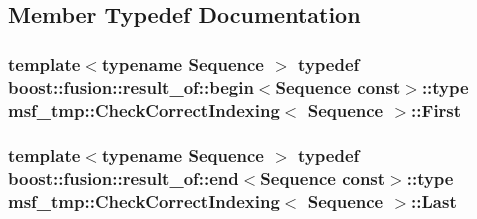 \subsection{Member Typedef Documentation}
\hypertarget{structmsf__tmp_1_1CheckCorrectIndexing_ac3c063547e54cc6ccb428b105beb2182}{
\subsubsection[{First}]{\setlength{\rightskip}{0pt plus 5cm}template$<$typename Sequence $>$ typedef boost\-::fusion\-::result\-\_\-of\-::begin$<$Sequence const$>$\-::type {\bf msf\-\_\-tmp\-::\-Check\-Correct\-Indexing}$<$ Sequence $>$\-::{\bf First}}}\label{structmsf__tmp_1_1CheckCorrectIndexing_ac3c063547e54cc6ccb428b105beb2182}
\hypertarget{structmsf__tmp_1_1CheckCorrectIndexing_a982feae67056fb51898a6019ab5ce02f}{
\subsubsection[{Last}]{\setlength{\rightskip}{0pt plus 5cm}template$<$typename Sequence $>$ typedef boost\-::fusion\-::result\-\_\-of\-::end$<$Sequence const$>$\-::type {\bf msf\-\_\-tmp\-::\-Check\-Correct\-Indexing}$<$ Sequence $>$\-::{\bf Last}}}\label{structmsf__tmp_1_1CheckCorrectIndexing_a982feae67056fb51898a6019ab5ce02f}


